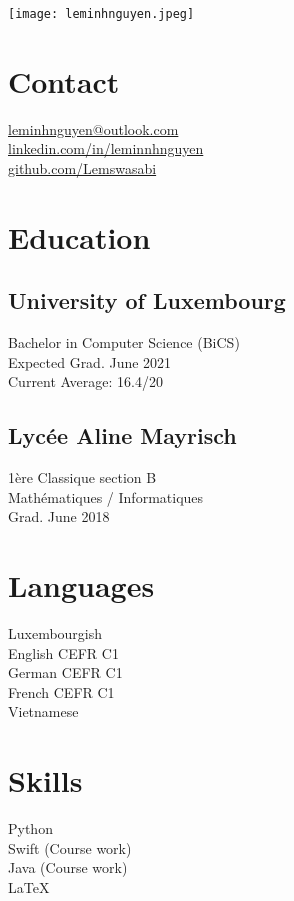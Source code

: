 \documentclass[]{curriculumvitae}
\begin{document}
\hfill \texttt{[image: leminhnguyen.jpeg]}
    
\begin{minipage}[t]{0.34\textwidth} 

\section{Contact}
\faEnvelope \hspace{1em} \href{}{leminhnguyen@outlook.com}\\ 
\faLinkedin \hspace{1em} \href{https://www.linkedin.com/in/leminnhnguyen}{linkedin.com/in/leminnhnguyen}\\
\faGithub \hspace{1em} \href{https://github.com/Lemswasabi}{github.com/Lemswasabi}
\sectionsep

\section{Education} 
\subsection{University of Luxembourg}
Bachelor in Computer Science (BiCS)\\
Expected Grad. June 2021\\
Current Average: 16.4/20\\

\subsection{Lycée Aline Mayrisch}
1ère Classique section B\\
Mathématiques / Informatiques\\
Grad. June 2018
\sectionsep

\section{Languages}
Luxembourgish\\
English CEFR C1\\
German CEFR C1\\
French CEFR C1\\
Vietnamese
\sectionsep

\section{Skills}
Python\\
Swift (Course work)\\
Java (Course work)\\
LaTeX
\sectionsep


\end{minipage}
\end{document}
